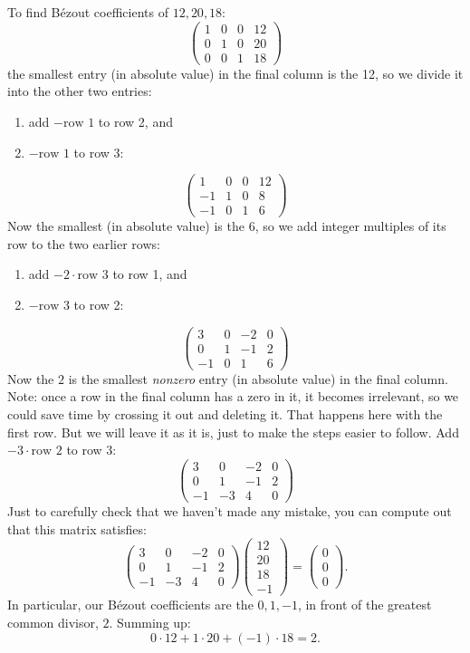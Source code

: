 \begin{example}
To find B\'ezout coefficients of \(12,20,18\):
\[
\begin{pmatrix}
1 & 0 & 0 & 12 \\
0 & 1 & 0 & 20 \\
0 & 0 & 1 & 18
\end{pmatrix}
\]
the smallest entry (in absolute value) in the final column is the 12, so we divide it into the other two entries:
\begin{enumerate}
\item
add \(-\text{row 1}\) to row 2, and 
\item
\(-\text{row 1}\) to row 3:
\end{enumerate}
\[
\begin{pmatrix}
1 & 0 & 0 & 12 \\
-1 & 1 & 0 & 8 \\
-1 & 0 & 1 & 6
\end{pmatrix}
\]
Now the smallest (in absolute value) is the \(6\), so we add integer multiples of its row to the two earlier rows:
\begin{enumerate}
\item
add \(-2\cdot\text{row 3}\) to row 1, and 
\item
\(-\text{row 3}\) to row 2:
\end{enumerate}
\[
\begin{pmatrix}
3 & 0 & -2 & 0 \\
0 & 1 & -1 & 2 \\
-1 & 0 & 1 & 6
\end{pmatrix}
\]
Now the \(2\) is the smallest \emph{nonzero} entry (in absolute value) in the final column.
Note: once a row in the final column has a zero in it, it becomes irrelevant, so we could save time by crossing it out and deleting it.
That happens here with the first row.
But we will leave it as it is, just to make the steps easier to follow.
Add \(-3\cdot\text{row 2}\) to row 3:
\[
\begin{pmatrix}
3 & 0 & -2 & 0 \\
0 & 1 & -1 & 2 \\
-1 & -3 & 4 & 0
\end{pmatrix}
\]
Just to carefully check that we haven't made any mistake, you can compute out that this matrix satisfies:
\[
\begin{pmatrix}
3 & 0 & -2 & 0 \\
0 & 1 & -1 & 2 \\
-1 & -3 & 4 & 0
\end{pmatrix}
\begin{pmatrix}
12 \\
20 \\
18 \\
-1
\end{pmatrix}
=
\begin{pmatrix}
0 \\
0 \\
0
\end{pmatrix}.
\]
In particular, our B\'ezout coefficients are the \(0,1,-1\), in front of the greatest common divisor, \(2\).
Summing up:
\[
0 \cdot 12 + 1 \cdot 20 + (-1)\cdot 18 = 2.
\]
\end{example}


